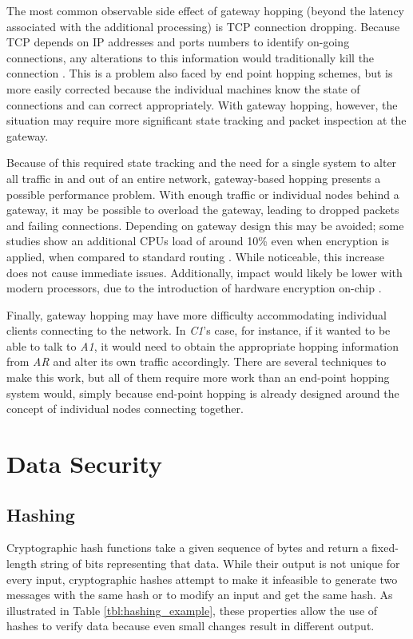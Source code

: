 \par The most common observable side effect of gateway hopping (beyond the latency associated with the additional processing) is \ac{TCP} connection dropping. Because TCP depends on IP addresses and ports numbers to identify on-going connections, any alterations to this information would traditionally kill the connection \cite{NASR}. This is a problem also faced by end point hopping schemes, but is more easily corrected because the individual machines know the state of connections and can correct appropriately. With gateway hopping, however, the situation may require more significant state tracking and packet inspection at the gateway.

\par Because of this required state tracking and the need for a single system to alter all traffic in and out of an entire network, gateway-based hopping presents a possible performance problem. With enough traffic or individual nodes behind a gateway, it may be possible to overload the gateway, leading to dropped packets and failing connections. Depending on gateway design this may be avoided; some studies show an additional \acsp{CPU} load of around 10\% even when encryption is applied, when compared to standard routing \cite{TAO}. While noticeable, this increase does not cause immediate issues. Additionally, impact would likely be lower with modern processors, due to the introduction of hardware encryption on-chip \cite{AESNISHA3}.

\par Finally, gateway hopping may have more difficulty accommodating individual clients connecting to the network. In \textit{C1}'s case, for instance, if it wanted to be able to talk to \textit{A1}, it would need to obtain the appropriate hopping information from \textit{AR} and alter its own traffic accordingly. There are several techniques to make this work, but all of them require more work than an end-point hopping system would, simply because end-point hopping is already designed around the concept of individual nodes connecting together.

\section{Data Security}
\label{sec:data_security}

\subsection{Hashing}
\label{sec:hashing}
\par Cryptographic hash functions take a given sequence of bytes and return a fixed-length string of bits representing that data. While their output is not unique for every input, cryptographic hashes attempt to make it infeasible to generate two messages with the same hash or to modify an input and get the same hash. As illustrated in Table \ref{tbl:hashing_example}, these properties allow the use of hashes to verify data because even small changes result in different output.

